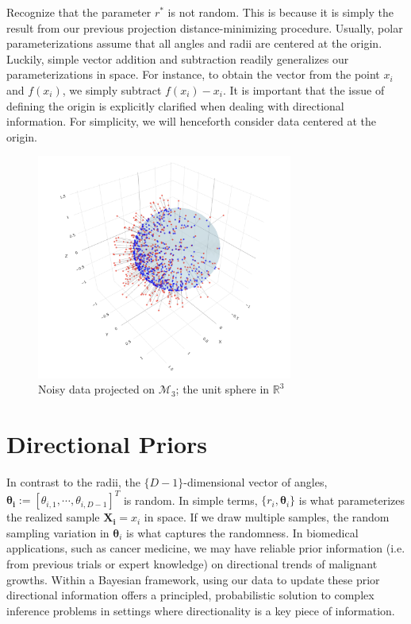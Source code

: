 \documentclass[twoside,11pt]{article}
\begin{document}
Recognize that the parameter $r^*$ is not random. This is because it is simply the result from our previous projection distance-minimizing procedure. Usually, polar parameterizations assume that all angles and radii are centered at the origin. Luckily, simple vector addition and subtraction readily generalizes our parameterizations in space. For instance, to obtain the vector from the point $x_i$ and $f(x_i)$, we simply subtract $f(x_i) - x_i$. It is important that the issue of defining the origin is explicitly clarified when dealing with directional information. For simplicity, we will henceforth consider data centered at the origin.

\begin{figure}
  \begin{center}
    \includegraphics[width=0.75\textwidth]{../fig/data-with-noise.png}
  \end{center}
  \caption{Noisy data projected on $\mathcal{M}_3$; the unit sphere in $\mathbb{R}^3$}\label{fig:data-with-noise}
\end{figure}


\section{Directional Priors}

In contrast to the radii, the $\{D-1\}$-dimensional vector of angles, $\boldsymbol{\theta_i} := [\theta_{i, 1}, \cdots, \theta_{i, D-1}]^T$ is random. In simple terms, $\{r_i, \boldsymbol{\theta}_i\}$ is what parameterizes the realized sample $\boldsymbol{X_i} = x_i$ in space. If we draw multiple samples, the random sampling variation in $\mathbf{\theta}_i$ is what captures the randomness. In biomedical applications, such as cancer medicine, we may have reliable prior information (i.e. from previous trials or expert knowledge) on directional trends of malignant growths. Within a Bayesian framework, using our data to update these prior directional information offers a principled, probabilistic solution to complex inference problems in settings where directionality is a key piece of information.   
\end{document}

